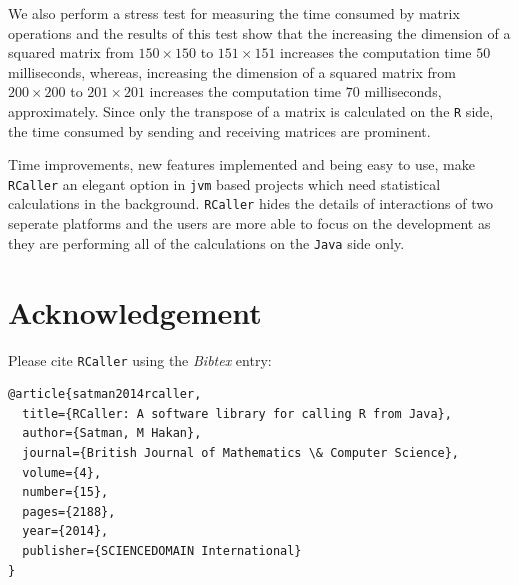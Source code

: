 \documentclass[10pt,a4paper, final, oneside]{article}
\begin{document}
We also perform a stress test for measuring the time consumed by matrix operations and the results of this test show that the increasing the dimension of a squared matrix from $150 \times 150$ to $151 \times 151$ increases the computation time $50$ milliseconds, whereas, increasing the dimension of a squared matrix from $200 \times 200$ to $201 \times 201$ increases the computation time $70$ milliseconds, approximately. Since only the transpose of a matrix is calculated on the \texttt{R} side, the time consumed by sending and receiving matrices are prominent. 

Time improvements, new features implemented and being easy to use, make \texttt{RCaller} an elegant option in \texttt{jvm} based projects which need statistical calculations in the background. \texttt{RCaller} hides the details of interactions of two seperate platforms and the users are more able to focus on the development as they are performing all of the calculations on the \texttt{Java} side only.






%






\newpage
\section*{Acknowledgement}
Please cite \texttt{RCaller} using the \emph{Bibtex} entry: \\

\begin{minipage}{\linewidth}
\begin{verbatim}
@article{satman2014rcaller,
  title={RCaller: A software library for calling R from Java},
  author={Satman, M Hakan},
  journal={British Journal of Mathematics \& Computer Science},
  volume={4},
  number={15},
  pages={2188},
  year={2014},
  publisher={SCIENCEDOMAIN International}
}
\end{verbatim}
\end{minipage}
\end{document}
